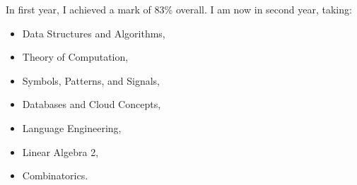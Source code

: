 \documentclass[10pt,a4paper,ragged2e,table]{altacv}
\begin{document}

\begin{fullwidth}
\makecvheader
\end{fullwidth}



In first year, I achieved a mark of 83\% overall. I am now in 
second year, taking: \begin{multicols}{2}
  \begin{itemize}
    \item Data Structures and Algorithms,
    \item Theory of Computation,
    \item Symbols, Patterns, and Signals,
    \item Databases and Cloud Concepts,
  \end{itemize}
  \columnbreak
  \begin{itemize}
    \item Language Engineering,
    \item Linear Algebra 2,
    \item Combinatorics.
  \end{itemize}
\end{multicols}

\divider

\end{document}
